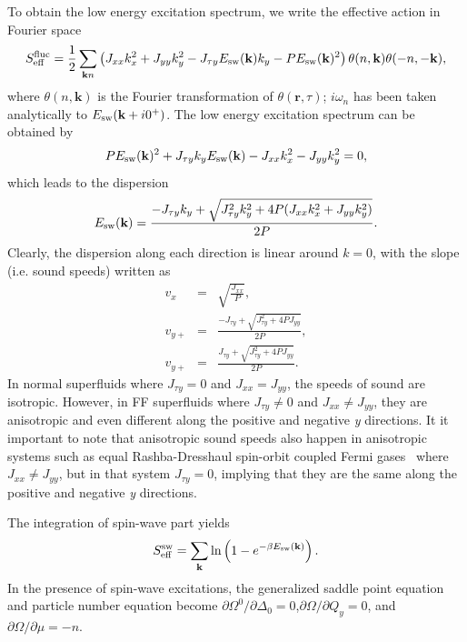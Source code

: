 \documentclass[prl,aps,twocolumn,showpacs, floatfix]{revtex4}
\begin{document}
\begin{widetext}
To obtain the low energy excitation spectrum, we write the effective action
in Fourier space
\begin{equation}
S_{\rm eff}^{\rm fluc}=\frac{1}{2}\sum_{\mathbf{k}n}\left(
J_{xx}k_{x}^{2}+J_{yy}k_{y}^{2}-J_{\tau y}E_{\rm sw}(\mathbf{k})k_{y}-PE_{\rm sw}(%
\mathbf{k})^{2}\right) \theta (n,\mathbf{k})\theta (-n,-\mathbf{k}),
\end{equation}%
where $\theta (n,\mathbf{k})$ is the Fourier transformation of $\theta (%
\mathbf{r},\tau )$; $i\omega _{n}$ has been taken analytically to $E_{\rm sw}(%
\mathbf{k}+i0^{+})$. The low energy excitation spectrum can be obtained by
\begin{equation}
PE_{\rm sw}(\mathbf{k})^{2}+J_{\tau y}k_{y}E_{\rm sw}(\mathbf{k}%
)-J_{xx}k_{x}^{2}-J_{yy}k_{y}^{2}=0,
\end{equation}%
which leads to the dispersion
\begin{equation}
E_{\rm sw}(\mathbf{k})=\frac{-J_{\tau y}k_{y}+\sqrt{J_{\tau
y}^{2}k_{y}^{2}+4P(J_{xx}k_{x}^{2}+J_{yy}k_{y}^{2})}}{2P}.
\end{equation}%
Clearly, the dispersion along each direction is linear around $k=0$, with
the slope (i.e. sound speeds) written as
\begin{eqnarray}
v_{x} &=&\sqrt{\frac{J_{xx}}{P}}, \\
v_{y+} &=&\frac{-J_{\tau y}+\sqrt{J_{\tau y}^{2}+4PJ_{yy}}}{2P}, \\
v_{y+} &=&\frac{J_{\tau y}+\sqrt{J_{\tau y}^{2}+4PJ_{yy}}}{2P}.
\end{eqnarray}%
In normal superfluids where $J_{\tau y}=0$ and $J_{xx}=J_{yy}$, the speeds of
sound are isotropic. However, in FF superfluids where $J_{\tau y}\neq 0$ and
$J_{xx}\neq J_{yy}$, they are anisotropic and even different along the
positive and negative \textit{y} directions. It it important to note that
anisotropic sound speeds also happen in anisotropic systems such as equal
Rashba-Dresshaul spin-orbit coupled Fermi gases~\cite{Melo2014arXivS} where $%
J_{xx}\neq J_{yy}$, but in that system $J_{\tau y}=0$, implying that they are
the same along the positive and negative \textit{y} directions.

The integration of spin-wave part yields
\begin{equation}
S_{\rm eff}^{\rm sw}=\sum_{\mathbf{k}}\text{ln}\left(1-e^{-\beta E_{\rm sw}(\mathbf{k}%
)}\right).
\end{equation}
In the presence of spin-wave excitations, the generalized saddle point
equation and particle number equation become $\partial\Omega^0/\partial%
\Delta_0=0$,$\partial\Omega/\partial Q_y=0$, and $\partial\Omega/\partial%
\mu=-n$.


\end{widetext}
\end{document}
